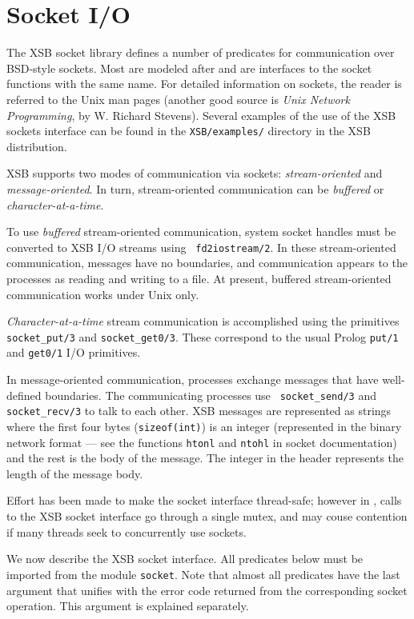 \section{Socket I/O}

The XSB socket library defines a number of predicates for
communication over BSD-style sockets. Most are modeled after and are
interfaces to the socket functions with the same name. For detailed
information on sockets, the reader is referred to the Unix man pages
(another good source is \emph{Unix Network Programming}, by W.
Richard Stevens).  Several examples of the use of the XSB sockets
interface can be found in the {\tt XSB/examples/} directory in the XSB
distribution.

XSB supports two modes of communication via sockets:
\emph{stream-oriented} and \emph{message-oriented}. In turn,
stream-oriented communication can be \emph{buffered} or
\emph{character-at-a-time}.

To use \emph{buffered} stream-oriented communication, system socket
handles must be converted to XSB I/O streams using {\tt
  fd2iostream/2}.  In these stream-oriented communication, messages
have no boundaries, and communication appears to the processes as
reading and writing to a file.  At present, buffered stream-oriented
communication works under Unix only.

\emph{Character-at-a-time} stream communication is accomplished using
the primitives {\tt socket\_put/3} and {\tt socket\_get0/3}. These
correspond to the usual Prolog {\tt put/1} and {\tt get0/1} I/O primitives.

In message-oriented communication, processes exchange messages that have
well-defined boundaries. The communicating processes use {\tt
  socket\_send/3} and {\tt socket\_recv/3} to talk to each other.
XSB messages are represented as strings where the first four bytes
({\tt sizeof(int)}) is an integer (represented in the binary network format
--- see the functions {\tt htonl} and {\tt ntohl} in socket documentation)
and the rest is the body of the message. The integer in the header
represents the length of the message body.

Effort has been made to make the socket interface thread-safe; however
in \version, calls to the XSB socket interface go through a single
mutex, and may couse contention if many threads seek to concurrently
use sockets.

We now describe the XSB socket interface.  All predicates below must be
imported from the module {\tt socket}. Note that almost all predicates have
the last argument that unifies with the error code returned from the
corresponding socket operation. This argument is explained separately.

